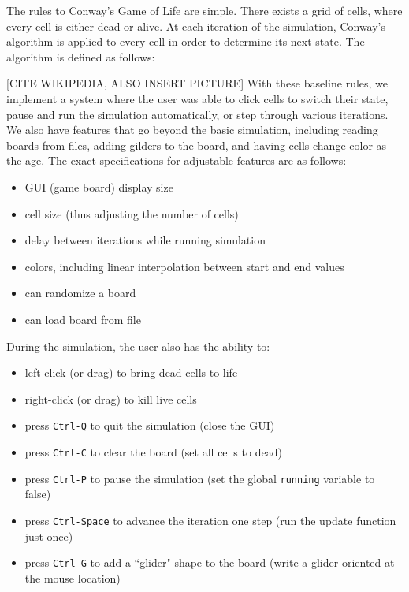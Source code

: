 \documentclass[onecolumn,12pt]{IEEEtran}
\begin{document}
  The rules to Conway's Game of Life are simple. There exists a grid of cells,
  where every cell is either dead or alive. At each iteration of the simulation,
  Conway's algorithm is applied to every cell in order to determine its next
  state. The algorithm is defined as follows:


  [CITE WIKIPEDIA, ALSO INSERT PICTURE] With these baseline rules, we implement a
  system where the user was able to click cells to switch their state, pause and
  run the simulation automatically, or step through various iterations. We also
  have features that go beyond the basic simulation, including reading boards
  from files, adding gilders to the board, and having cells change color as the
  age. The exact specifications for adjustable features are as follows:
  \begin{itemize}
    \item GUI (game board) display size
    \item cell size (thus adjusting the number of cells) 
    \item delay between iterations while running simulation
    \item colors, including linear interpolation between start and end values
    \item can randomize a board
    \item can load board from file
  \end{itemize} 
  During the simulation, the user also has the ability to: 
  \begin{itemize}
    \item left-click (or drag) to bring dead cells to life
    \item right-click (or drag) to kill live cells
    \item press \texttt{Ctrl-Q} to quit the simulation (close the GUI) 
    \item press \texttt{Ctrl-C} to clear the board (set all cells to dead) 
    \item press \texttt{Ctrl-P} to pause the simulation (set the global
      \texttt{running} variable to false)
    \item press \texttt{Ctrl-Space} to advance the iteration one step (run the
      update function just once)
    \item press \texttt{Ctrl-G} to add a ``glider" shape to the board (write a
      glider oriented at the mouse location)
  \end{itemize} 
\end{document}
